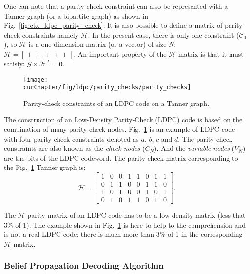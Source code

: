 One can note that a parity-check constraint can also be represented with a
Tanner graph (or a bipartite graph) as shown in
Fig.~\ref{fig:ctx_ldpc_parity_check}. It is also possible to define a matrix of
parity-check constraints namely $\bm{\mathcal{H}}$. In the present case, there
is only one constraint ($\mathcal{C}_0$), so $\bm{\mathcal{H}}$ is a
one-dimension matrix (or a vector) of size $N$:
$
\bm{\mathcal{H}} =
\begin{bmatrix}
1 & 1 & 1 & 1 & 1
\end{bmatrix}.
$
An important property of the $\bm{\mathcal{H}}$ matrix is that it must satisfy:
$\bm{\mathcal{G}} \times \bm{\mathcal{H}}^T = \bm{0}.$

\begin{figure}[htp]
  \centering
  \texttt{[image: \\curChapter/fig/ldpc/parity\_checks/parity\_checks]}
  \caption{Parity-check constraints of an LDPC code on a Tanner graph.}
  \label{fig:ctx_ldpc_parity_checks}
\end{figure}

The construction of an Low-Density Parity-Check (LDPC) code is based on the
combination of many parity-check nodes. Fig.~\ref{fig:ctx_ldpc_parity_checks} is
an example of LDPC code with four parity-check constraints denoted as $a$, $b$,
$c$ and $d$. The parity-check constraints are also known as the \emph{check
nodes} ($C_N$). And the \emph{variable nodes} ($V_N$) are the bits of the LDPC
codeword. The parity-check matrix corresponding to the
Fig.~\ref{fig:ctx_ldpc_parity_checks} Tanner graph is:
\begin{equation*}
\bm{\mathcal{H}} =
\begin{bmatrix}
  1 & 0 & 0 & 1 & 1 & 0 & 1 & 1\\
  0 & 1 & 1 & 0 & 0 & 1 & 1 & 0\\
  1 & 0 & 1 & 0 & 0 & 1 & 0 & 1\\
  0 & 1 & 0 & 1 & 1 & 0 & 1 & 0
\end{bmatrix}.
\end{equation*}

The $\bm{\mathcal{H}}$ parity matrix of an LDPC code has to be a low-density
matrix (less that 3\% of 1). The example shown in
Fig.~\ref{fig:ctx_ldpc_parity_checks} is here to help to the comprehension and
is not a real LDPC code: there is much more than 3\% of 1 in the corresponding
$\bm{\mathcal{H}}$ matrix.

\subsubsection{Belief Propagation Decoding Algorithm}

